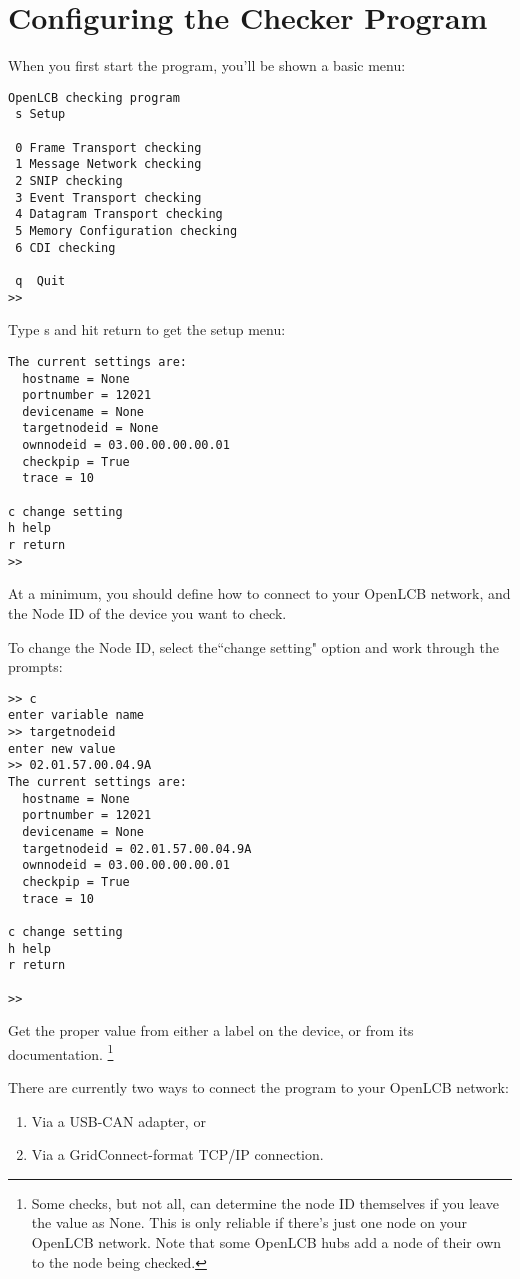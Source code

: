 \documentclass[11pt]{article}
\begin{document}
\section{Configuring the Checker Program}

When you first start the program, you'll be shown a basic menu:

\begin{verbatim}
OpenLCB checking program
 s Setup

 0 Frame Transport checking
 1 Message Network checking
 2 SNIP checking
 3 Event Transport checking
 4 Datagram Transport checking
 5 Memory Configuration checking
 6 CDI checking
  
 q  Quit
>> 
\end{verbatim}

Type s and hit return to get the setup menu:

\begin{verbatim}
The current settings are:
  hostname = None
  portnumber = 12021
  devicename = None
  targetnodeid = None
  ownnodeid = 03.00.00.00.00.01
  checkpip = True
  trace = 10

c change setting
h help
r return
>> 
\end{verbatim}

At a minimum, you should define how to connect to your OpenLCB network,
and the Node ID of the device you want to check.  

To change the Node ID, select the``change setting" option and work through the prompts:

\begin{verbatim}
>> c
enter variable name
>> targetnodeid
enter new value
>> 02.01.57.00.04.9A
The current settings are:
  hostname = None
  portnumber = 12021
  devicename = None
  targetnodeid = 02.01.57.00.04.9A
  ownnodeid = 03.00.00.00.00.01
  checkpip = True
  trace = 10

c change setting
h help
r return

>> 
\end{verbatim}

Get the proper value from either a label on the device, or from its documentation.
\footnote{Some checks, but not all, can determine the node ID themselves if you leave
    the value as None. This is only reliable if there's just one node on your OpenLCB
    network.  Note that some OpenLCB hubs add a node of their own to the node
    being checked.}
    
There are currently two ways to connect the program to your OpenLCB network:
\begin{enumerate}
\item Via a USB-CAN adapter, or
\item Via a GridConnect-format TCP/IP connection.
\end{enumerate}
\end{document}

